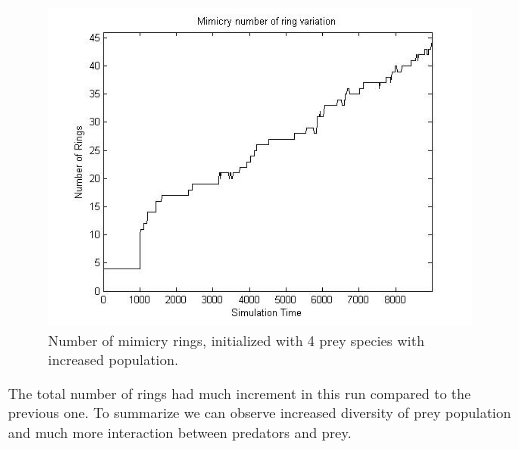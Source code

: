 \begin{figure}[H]
	\centering
	\includegraphics[scale=0.50]{images/ringSize10k-4MorePrey}
	\caption[Number of mimicry rings (4 prey species, increased population)]{Number of mimicry rings, initialized with 4 prey species with increased population.}
	\label{fig:ringSize10k-4MorePrey}
\end{figure}

The total number of rings had much increment in this run compared to the previous one. To summarize we can observe increased diversity of prey population and much more interaction between predators and prey.

